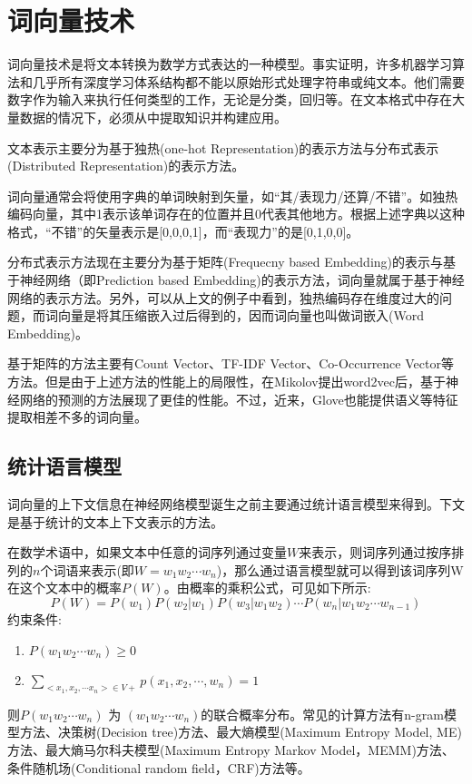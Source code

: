 \documentclass[a4paper,AutoFakeBold,oneside,12pt]{book}
\begin{document}
\chapter{词向量技术}

词向量技术是将文本转换为数学方式表达的一种模型。事实证明，许多机器学习算法和几乎所有深度学习体系结构都不能以原始形式处理字符串或纯文本。他们需要数字作为输入来执行任何类型的工作，无论是分类，回归等。在文本格式中存在大量数据的情况下，必须从中提取知识并构建应用。

文本表示主要分为基于独热(one-hot Representation)的表示方法与分布式表示(Distributed Representation)的表示方法。

词向量通常会将使用字典的单词映射到矢量，如“其/表现力/还算/不错”。如独热编码向量，其中1表示该单词存在的位置并且0代表其他地方。根据上述字典以这种格式，“不错”的矢量表示是[0,0,0,1]，而“表现力”的是[0,1,0,0]。

分布式表示方法现在主要分为基于矩阵(Frequecny based Embedding)的表示与基于神经网络（即Prediction based Embedding)的表示方法，词向量就属于基于神经网络的表示方法。另外，可以从上文的例子中看到，独热编码存在维度过大的问题，而词向量是将其压缩嵌入过后得到的，因而词向量也叫做词嵌入(Word Embedding)。

基于矩阵的方法主要有Count Vector、TF-IDF Vector、Co-Occurrence Vector等方法。但是由于上述方法的性能上的局限性，在Mikolov提出word2vec后，基于神经网络的预测的方法展现了更佳的性能。不过，近来，Glove也能提供语义等特征提取相差不多的词向量。

\section{统计语言模型}
词向量的上下文信息在神经网络模型诞生之前主要通过统计语言模型来得到。下文是基于统计的文本上下文表示的方法。

在数学术语中，如果文本中任意的词序列通过变量$W$来表示，则词序列通过按序排列的$n$个词语来表示(即$W=w_1w_2 \cdots w_n$)，那么通过语言模型就可以得到该词序列W在这个文本中的概率$P(W)$。由概率的乘积公式，可见如下所示:
$$ P(W)=P(w_1)P(w_2 | w_1)P(w_3 | w_1w_2) \cdots P(w_n|w_1w_2 \cdots w_{n-1}) $$
约束条件:
\begin{enumerate}
    \item $ P(w_1w_2 \cdots w_n) \geq 0 $
    \item $ \sum_{<x_1,x_2,\cdots x_n> \in V+}{p(x_1,x_2, \cdots, w_n)} = 1$
\end{enumerate}
则$ P(w_1w_2 \cdots w_n) $ 为 $ (w_1w_2 \cdots w_n) $的联合概率分布。常见的计算方法有n-gram模型方法、决策树(Decision tree)方法、最大熵模型(Maximum Entropy Model, ME)方法、最大熵马尔科夫模型(Maximum Entropy Markov Model，MEMM)方法、条件随机场(Conditional random field，CRF)方法等。
\end{document}
